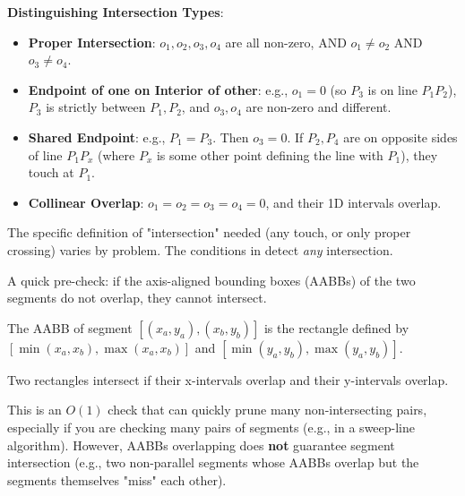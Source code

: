 \begin{gotcha}
\label{gotcha:A.1.5.proper_vs_improper}
\textbf{Distinguishing Intersection Types}:
\begin{itemize}
    \item \textbf{Proper Intersection}: $o_1, o_2, o_3, o_4$ are all non-zero, AND $o_1 \neq o_2$ AND $o_3 \neq o_4$.
    \item \textbf{Endpoint of one on Interior of other}: e.g., $o_1 = 0$ (so $P_3$ is on line $P_1P_2$), $P_3$ is strictly between $P_1, P_2$, and $o_3, o_4$ are non-zero and different.
    \item \textbf{Shared Endpoint}: e.g., $P_1 = P_3$. Then $o_3 = 0$. If $P_2, P_4$ are on opposite sides of line $P_1P_x$ (where $P_x$ is some other point defining the line with $P_1$), they touch at $P_1$.
    \item \textbf{Collinear Overlap}: $o_1 = o_2 = o_3 = o_4 = 0$, and their 1D intervals overlap.
\end{itemize}
The specific definition of "intersection" needed (any touch, or only proper crossing) varies by problem. The conditions in  detect \textit{any} intersection.
\end{gotcha}


\begin{insight}
\label{insight:A.1.5.bounding_box_opt}
A quick pre-check: if the axis-aligned bounding boxes (AABBs) of the two segments do not overlap, they cannot intersect.

The AABB of segment $[(x_a, y_a), (x_b, y_b)]$ is the rectangle defined by $[\min(x_a, x_b), \max(x_a, x_b)]$ and $[\min(y_a, y_b), \max(y_a, y_b)]$.

Two rectangles intersect if their x-intervals overlap and their y-intervals overlap.

This is an $O(1)$ check that can quickly prune many non-intersecting pairs, especially if you are checking many pairs of segments (e.g., in a sweep-line algorithm). However, AABBs overlapping does \textbf{not} guarantee segment intersection (e.g., two non-parallel segments whose AABBs overlap but the segments themselves "miss" each other).
\end{insight}